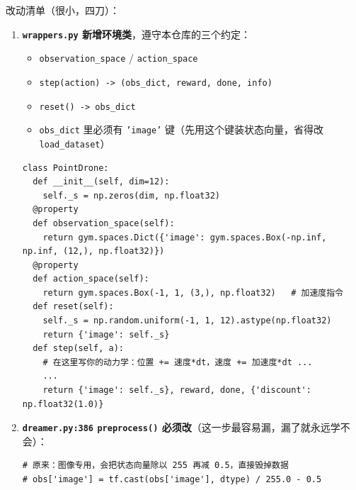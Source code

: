 \documentclass[11pt]{ctexart}
\begin{document}
改动清单（很小，四刀）：
\begin{enumerate}
  \item \textbf{\texttt{wrappers.py} 新增环境类}，遵守本仓库的三个约定：
  \begin{itemize}
    \item \texttt{observation\_space} / \texttt{action\_space}
    \item \texttt{step(action) -> (obs\_dict, reward, done, info)}
    \item \texttt{reset() -> obs\_dict}
    \item \texttt{obs\_dict} 里必须有 \texttt{'image'} 键（先用这个键装状态向量，省得改 \texttt{load\_dataset}）
  \end{itemize}
\begin{Verbatim}[frame=single,fontsize=\small]
class PointDrone:
  def __init__(self, dim=12):
    self._s = np.zeros(dim, np.float32)
  @property
  def observation_space(self):
    return gym.spaces.Dict({'image': gym.spaces.Box(-np.inf, np.inf, (12,), np.float32)})
  @property
  def action_space(self):
    return gym.spaces.Box(-1, 1, (3,), np.float32)   # 加速度指令
  def reset(self):
    self._s = np.random.uniform(-1, 1, 12).astype(np.float32)
    return {'image': self._s}
  def step(self, a):
    # 在这里写你的动力学：位置 += 速度*dt，速度 += 加速度*dt ...
    ...
    return {'image': self._s}, reward, done, {'discount': np.float32(1.0)}
\end{Verbatim}
  \item \textbf{\texttt{dreamer.py:386} \texttt{preprocess()} 必须改}（这一步最容易漏，漏了就永远学不会）：
\begin{Verbatim}[frame=single,fontsize=\small]
# 原来：图像专用，会把状态向量除以 255 再减 0.5，直接毁掉数据
# obs['image'] = tf.cast(obs['image'], dtype) / 255.0 - 0.5


\end{Verbatim}
\end{enumerate}
\end{document}
